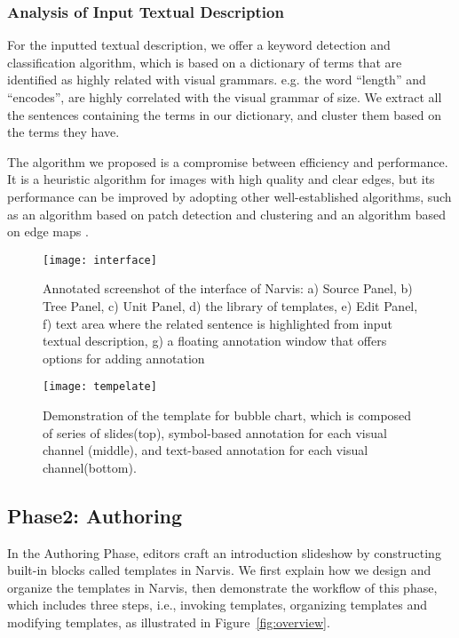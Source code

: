 \subsubsection{Analysis of Input Textual Description}
For the inputted textual description, we offer a keyword detection and classification algorithm, which is based on a dictionary of terms that are identified as highly related with visual grammars. e.g. the word ``length'' and ``encodes'', are highly correlated with the  visual grammar of size. We extract all the sentences containing the terms in our dictionary, and cluster them based on the terms they have.

The algorithm we proposed is a compromise between efficiency and performance. It is a heuristic algorithm for images with high quality and clear edges, but its performance can be improved by adopting other well-established algorithms, such as an algorithm based on patch detection and clustering \cite{savva_revision:_2011} and an algorithm based on edge maps \cite{huang2003model}.


     
\begin{figure}
 \centering %
 \texttt{[image: interface]}
 \caption{Annotated screenshot of the interface of Narvis: a) Source Panel, b) Tree Panel, c) Unit Panel, d) the library of templates, e) Edit Panel, f) text area where the related sentence is highlighted from input textual description, g) a floating annotation window that offers options for adding annotation}
 \label{fig:interface}
\end{figure}   



\begin{figure}
 \centering 
 \texttt{[image: tempelate]}
 \caption{Demonstration of the template for bubble chart, which is composed of series of slides(top), symbol-based annotation for each visual channel (middle), and text-based annotation for each visual channel(bottom). }
 \label{fig:template}
\end{figure}


\subsection{Phase2: Authoring}
In the Authoring Phase, editors craft an introduction slideshow by constructing built-in blocks called templates in Narvis. We first explain how we design and organize the templates in Narvis, then demonstrate the workflow of this phase, which includes three steps, i.e., invoking templates, organizing templates and modifying templates, as illustrated in Figure~\ref{fig:overview}. 

